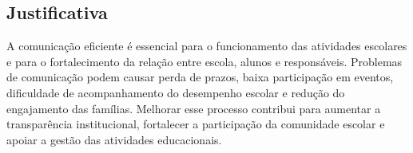 \subsection{Justificativa}
A comunicação eficiente é essencial para o funcionamento das atividades escolares e para o fortalecimento da relação entre escola, alunos e responsáveis. Problemas de comunicação podem causar perda de prazos, baixa participação em eventos, dificuldade de acompanhamento do desempenho escolar e redução do engajamento das famílias. Melhorar esse processo contribui para aumentar a transparência institucional, fortalecer a participação da comunidade escolar e apoiar a gestão das atividades educacionais.

